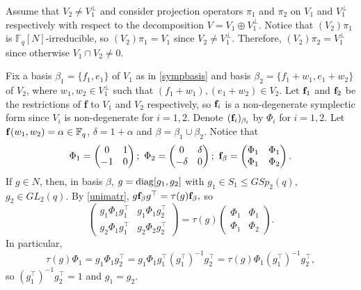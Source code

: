Assume that $V_2 \ne V_1^{\bot}$ and consider projection operators $\pi_1$ and $\pi_2$ on $V_1$ and $V_1^{\bot}$ respectively with respect to the decomposition $V=V_1 \oplus V_1^{\bot}.$ Notice that $(V_2)\pi_1$ is $\mathbb{F}_q[N]$-irreducible, so $(V_2)\pi_1=V_1$  since $V_2 \ne V_1^{\bot}.$  Therefore, $(V_2)\pi_2=V_1^{\bot}$ since otherwise $V_1 \cap V_2 \ne 0.$ 

Fix a basis $\beta_1=\{f_1, e_1\}$ of $V_1$ as in \eqref{sympbasis} and basis $\beta_2=\{f_1+w_1, e_1 +w_2\}$ of $V_2$, where $w_1, w_2 \in V_1^{\bot}$ such that $(f_1+w_1), (e_1 +w_2) \in V_2.$ Let ${\bf f}_1$ and ${\bf f}_2$ be the restrictions of {\bf f} to $V_1$ and $V_2$ respectively, so ${\bf f}_i$ is a non-degenerate symplectic form since $V_i$ is non-degenerate for $i=1,2.$  Denote   $({\bf f}_i)_{\beta_i}$ by $\Phi_i$ for $i=1,2.$ Let ${\bf f}(w_1,w_2)= \alpha \in \mathbb{F}_q$,  $\delta=1+\alpha$ and $\beta=\beta_1 \cup \beta_2$. Notice that 
$$\Phi_1=
\begin{pmatrix}
0&1 \\
-1&0
\end{pmatrix}; \text{ }
\Phi_2=
\begin{pmatrix}
0&\delta \\
-\delta&0
\end{pmatrix}; \text{ }
{\bf f}_{\beta}=
\begin{pmatrix}
\Phi_1&\Phi_1 \\
\Phi_1&\Phi_2
\end{pmatrix}.
$$
If $g \in N$, then, in basis $\beta$, $g=\mathrm{diag}[g_1, g_2]$ with $g_1 \in S_1 \le GSp_2(q),$ $g_2 \in GL_2(q).$ By \eqref{unimatr}, $g {\bf f}_{\beta}g^{\top}=\tau(g){\bf f}_{\beta},$ so 
$$
\begin{pmatrix}
g_1\Phi_1 g_1^{\top}&g_1\Phi_1 g_2^{\top} \\
g_2\Phi_1 g_1^{\top}&g_2\Phi_2 g_2^{\top}
\end{pmatrix}=\tau(g)
\begin{pmatrix}
\Phi_1&\Phi_1 \\
\Phi_1&\Phi_2
\end{pmatrix}.
$$
In particular, $$\tau(g)\Phi_1=g_1 \Phi_1 g_2^{\top}=g_1 \Phi_1g_1^{\top}(g_1^{\top})^{-1} g_2^{\top}=\tau(g)\Phi_1(g_1^{\top})^{-1} g_2^{\top},$$
so $(g_1^{\top})^{-1} g_2^{\top}=1$ and $g_1=g_2.$


